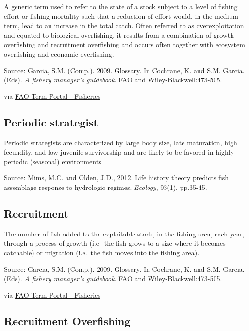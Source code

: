 \documentclass[
  11pt,
]{book}
\begin{document}
A generic term used to refer to the state of a stock subject to a level of fishing effort or fishing mortality such that a reduction of effort would, in the medium term, lead to an increase in the total catch. Often referred to as overexploitation and equated to biological overfishing, it results from a combination of growth overfishing and recruitment overfishing and occurs often together with ecosystem overfishing and economic overfishing.

Source: Garcia, S.M. (Comp.). 2009. Glossary. In Cochrane, K. and S.M. Garcia. (Eds). \emph{A fishery manager's guidebook}. FAO and Wiley-Blackwell:473-505.

via \href{http://www.fao.org/fishery/glossary/en}{FAO Term Portal - Fisheries}

\hypertarget{periodic-strategist}{%
\subsection{Periodic strategist}\label{periodic-strategist}}

Periodic strategists are characterized by large body size, late maturation, high fecundity, and low juvenile survivorship and are likely to be favored in highly periodic (seasonal) environments

Source: Mims, M.C. and Olden, J.D., 2012. Life history theory predicts fish assemblage response to hydrologic regimes. \emph{Ecology}, 93(1), pp.35-45.

\hypertarget{recruitment}{%
\subsection{Recruitment}\label{recruitment}}

The number of fish added to the exploitable stock, in the fishing area, each year, through a process of growth (i.e.~the fish grows to a size where it becomes catchable) or migration (i.e.~the fish moves into the fishing area).

Source: Garcia, S.M. (Comp.). 2009. Glossary. In Cochrane, K. and S.M. Garcia. (Eds). \emph{A fishery manager's guidebook}. FAO and Wiley-Blackwell:473-505.

via \href{http://www.fao.org/fishery/glossary/en}{FAO Term Portal - Fisheries}

\hypertarget{recruitment-overfishing}{%
\subsection{Recruitment Overfishing}\label{recruitment-overfishing}}
\end{document}
